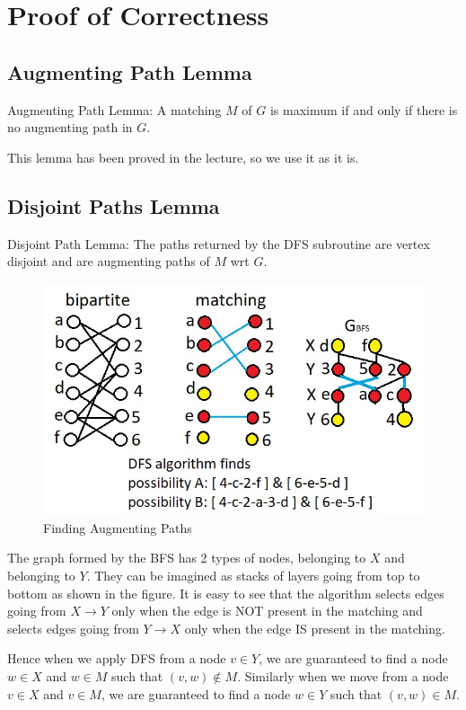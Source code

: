 \documentclass{article}
\begin{document}
\section{Proof of Correctness}
\subsection{Augmenting Path Lemma}
Augmenting Path Lemma: A matching $M$ of $G$ is maximum if and only if there is no augmenting path in $G$.

This lemma has been proved in the lecture, so we use it as it is.

\subsection{Disjoint Paths Lemma}
Disjoint Path Lemma: The paths returned by the DFS subroutine are vertex disjoint and are augmenting paths of $M$ wrt $G$.

\begin{figure}[!h]
    \centering
    \includegraphics[scale=0.8]{hopcroftkarp_bfs.jpg}
    \caption{Finding Augmenting Paths}
\end{figure}

The graph formed by the BFS has 2 types of nodes, belonging to $X$ and belonging to $Y$. They can be imagined as stacks of layers going from top to bottom as shown in the figure. It is easy to see that the algorithm selects edges going from $X \to Y$ only when the edge is NOT present in the matching and selects edges going from $Y \to X$ only when the edge IS present in the matching.

Hence when we apply DFS from a node $v \in Y$, we are guaranteed to find a node $w \in X$ and $w \in M$ such that $(v, w) \notin M$. Similarly when we move from a node $v \in X $ and $v \in M$, we are guaranteed to find a node $w \in Y$ such that $(v, w) \in M$.
\end{document}
